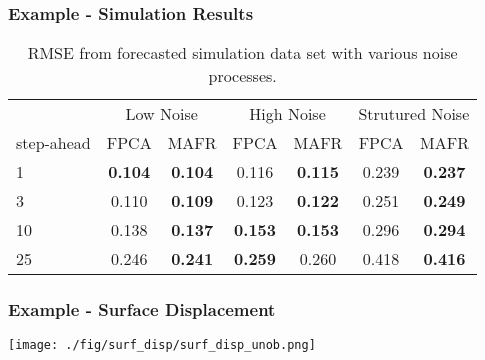 \documentclass[aspectratio=169]{beamer}
\begin{document}
  \begin{frame}
    \frametitle{Example - Simulation Results}
    \begin{table}[h]
        \setlength{\arrayrulewidth}{1.5px}
        \setlength{\tabcolsep}{10pt}
        \centering
        \begin{tabular}{lcccccc} \toprule
            & \multicolumn{2}{c}{Low Noise} & \multicolumn{2}{c}{High Noise} & \multicolumn{2}{c}{Strutured Noise} \\
            step-ahead & FPCA & MAFR & FPCA & MAFR & FPCA & MAFR \\ \bottomrule
            1 & \textbf{0.104} & \textbf{0.104} & 0.116 & \textbf{0.115} & 0.239 & \textbf{0.237} \\
            3 & 0.110 & \textbf{0.109} & 0.123 & \textbf{0.122} & 0.251 & \textbf{0.249} \\
            10 & 0.138 & \textbf{0.137} & \textbf{0.153} & \textbf{0.153} & 0.296 & \textbf{0.294} \\
            25 & 0.246 & \textbf{0.241} & \textbf{0.259} & 0.260 & 0.418 & \textbf{0.416} \\
            \bottomrule
        \end{tabular}
        \caption{RMSE from forecasted simulation data set with various noise processes.}
    \end{table}
  \end{frame}

  \begin{frame}
    \frametitle{Example - Surface Displacement}
    
    \begin{center}
      \texttt{[image: ./fig/surf\_disp/surf\_disp\_unob.png]}
    \end{center}
    
  \end{frame}
\end{document}
